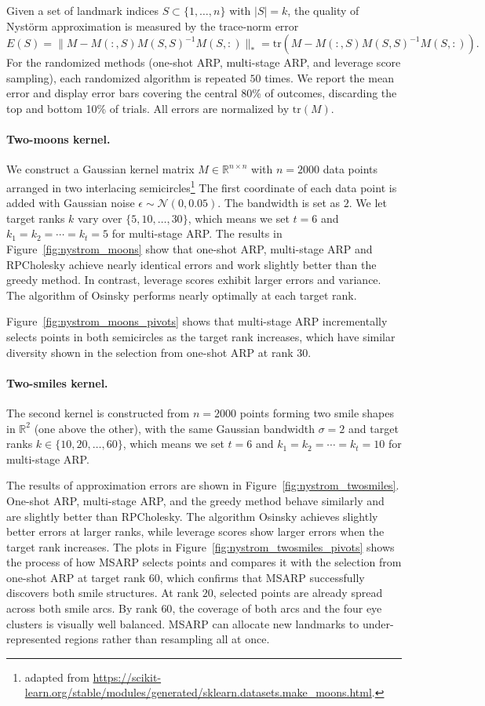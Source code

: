 \documentclass[11pt]{article}
\newcommand{\<}{\langle}
\renewcommand{\>}{\rangle}
\begin{document}
Given a set of landmark indices $S \subset \{1,\ldots,n\}$
with $|S| = k$, 
the quality of Nyst\"{o}rm approximation is measured by the trace-norm error
\[
    E(S) = \|M - M(:,S)M(S,S)^{-1}M(S,:)\|_* = \mathrm{tr}\!\left(M - M(:,S)M(S,S)^{-1}M(S,:)\right).
\]
For the randomized methods (one-shot ARP,
multi-stage ARP, and leverage score sampling), each randomized algorithm is repeated $50$ times. We report the mean error and display error bars covering the central 80\% of outcomes,
discarding the top and bottom 10\% of trials. All errors are normalized by $\mathrm{tr}(M)$. 

\paragraph{Two-moons kernel.}
We construct a Gaussian kernel matrix $M \in \mathbb{R}^{n \times n}$ with $n = 2000$ data
points arranged in two interlacing semicircles\footnote{adapted from \url{https://scikit-learn.org/stable/modules/generated/sklearn.datasets.make_moons.html}.} The first coordinate of each data point is added with Gaussian noise $\epsilon \sim \mathcal{N}(0,0.05)$. The bandwidth is set as $2$. We let target ranks
$k$ vary over $\{5, 10, \ldots, 30\}$, which means we set $t = 6$ and $k_1 = k_2 = \cdots = k_t = 5$ for multi-stage ARP. The results in Figure~\ref{fig:nystrom_moons} show that one-shot ARP,
multi-stage ARP and RPCholesky achieve nearly identical errors and work slightly better than the greedy method.
In contrast, leverage scores exhibit larger errors and variance. The algorithm of Osinsky performs nearly optimally at each target rank.
 
Figure~\ref{fig:nystrom_moons_pivots} shows that multi-stage ARP incrementally selects points in both semicircles as the target rank
increases, which have similar diversity shown in the selection from one-shot ARP at rank 30.

\paragraph{Two-smiles kernel.}
The second kernel is constructed from $n = 2000$ points forming two smile shapes
in $\mathbb{R}^2$ (one above the other), with the same Gaussian bandwidth $\sigma = 2$ and
target ranks $k \in \{10, 20, \ldots, 60\}$, which means we set $t = 6$ and $k_1 = k_2 = \cdots = k_t = 10$ for multi-stage ARP.
 
The results of approximation errors are shown in
Figure~\ref{fig:nystrom_twosmiles}. One-shot ARP, multi-stage ARP, and the greedy method
behave similarly and are slightly better than 
RPCholesky. The algorithm Osinsky achieves slightly better errors at larger ranks, while leverage scores
show larger errors when the target rank increases. The plots in Figure~\ref{fig:nystrom_twosmiles_pivots} shows the process of how MSARP selects points and compares it with the selection from one-shot ARP at target rank $60$, which confirms that MSARP successfully
discovers both smile structures. At rank $20$, selected points are already spread across both smile
arcs. By rank $60$, the coverage of both arcs and the four eye clusters is visually well
balanced. MSARP can allocate new landmarks to under-represented regions rather than
resampling all at once.
\end{document}
